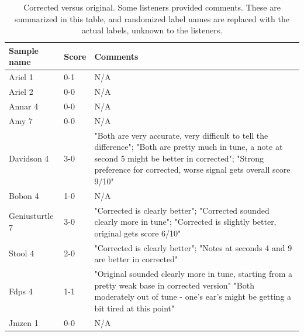 \begin{table}
  \begin{center}
    
    \label{tab:original-scores}
    \begin{tabularx}{\columnwidth}{|l|l|X|}
    \hline
\textbf{Sample name} & \textbf{Score} & \textbf{Comments} \\
\hline\hline
Ariel 1 & 0-1 & N/A \\
\hline
Ariel 2 & 0-0 & N/A \\ 
\hline
Annar 4 & 0-0 & N/A \\ 
\hline
Amy 7 & 0-0 & N/A \\
\hline
Davidson 4 & 3-0 & "Both are very accurate, very difficult to tell the difference"; "Both are pretty much in tune, a note at second 5 might be better in corrected"; "Strong preference for corrected, worse signal gets overall score 9/10"\\ 
\hline
Bobon 4 & 1-0 & N/A \\ 
\hline
Geniusturtle 7 & 3-0 & "Corrected is clearly better"; "Corrected sounded clearly more in tune"; "Corrected is slightly better, original gets score 6/10"\\ 
\hline
Stool 4 & 2-0 & "Corrected is clearly better"; "Notes at seconds 4 and 9 are better in corrected" \\ 
\hline
Fdps 4 & 1-1 & "Original sounded clearly more in tune, starting from a pretty weak base in corrected version" "Both moderately out of tune - one's ear's might be getting a bit tired at this point" \\ 
\hline
Jmzen 1 & 0-0 & N/A \\ 
\hline
    \end{tabularx}
    \caption{Corrected versus original. Some listeners provided comments. These are summarized in this table, and randomized label names are replaced with the actual labels, unknown to the listeners.}
  \end{center}
\end{table}






